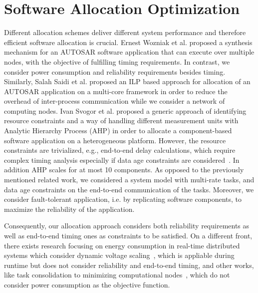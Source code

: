 \section{Software Allocation Optimization}
Different allocation schemes deliver different system performance and therefore efficient software allocation is crucial. Ernest Wozniak et al. \cite{Wozniak2013AnArchitectures} proposed a synthesis mechanism for an AUTOSAR software application that can execute over multiple nodes, with the objective of fulfilling timing requirements. In contrast, we consider power consumption and reliability requirements besides timing. Similarly, Salah Saidi et al. \cite{Saidi2015AnArchitectures} proposed an ILP based approach for allocation of an AUTOSAR application on a multi-core framework in order to reduce the overhead of inter-process communication while we consider a network of computing nodes. Ivan Svogor et al. \cite{vsvogor2014extended} proposed a generic approach of identifying resource constraints and a way of handling different measurement units with Analytic Hierarchy Process (AHP) in order to allocate a component-based software application on a heterogeneous platform. However, the resource constraints are trivialized, e.g., end-to-end delay calculations, which require complex timing analysis especially if data age constraints are considered~\cite{mubeen2013support}. In addition AHP scales for at most 10 components. As opposed to the previously mentioned related work, we considered a system model with multi-rate tasks, and data age constraints on the end-to-end communication of the tasks. Moreover, we consider fault-tolerant application, i.e. by replicating software components, to maximize the reliability of the application.

Consequently, our allocation approach considers both reliability requirements as well as end-to-end timing ones as constraints to be satisfied.  On a different front, there exists research focusing on energy consumption in real-time distributed systems which consider dynamic voltage scaling~\cite{bambagini2016energy}, which is appliable during runtime  but does not consider reliability and end-to-end timing, and other works, like task consolidation to minimizing computational nodes~\cite{faragardi2013towards}\cite{devadas2012interplay}, which do not consider power consumption as the objective function.
